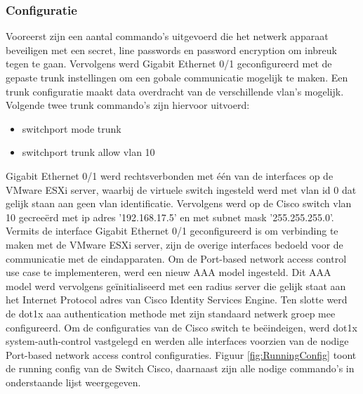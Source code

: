 \subsubsection{Configuratie}
\label{sec:config}
Vooreerst zijn een aantal commando's uitgevoerd die het netwerk apparaat beveiligen met een secret, line passwords en password encryption om inbreuk tegen te gaan. Vervolgens werd Gigabit Ethernet 0/1 geconfigureerd met de gepaste trunk instellingen om een gobale communicatie mogelijk te maken. Een trunk configuratie maakt data overdracht van de verschillende vlan's mogelijk. Volgende twee trunk commando's zijn hiervoor uitvoerd:  

\begin{itemize}
	\item switchport mode trunk
	\item switchport trunk allow vlan 10 
\end{itemize}

Gigabit Ethernet 0/1 werd rechtsverbonden met één van de interfaces op de VMware ESXi server, waarbij de virtuele switch ingesteld werd met vlan id 0 dat gelijk staan aan geen vlan identificatie. Vervolgens werd
op de Cisco switch vlan 10 gecreeërd met ip adres '192.168.17.5' en met subnet mask '255.255.255.0'. Vermits de interface Gigabit Ethernet 0/1 geconfigureerd is om verbinding te maken met de VMware ESXi server, zijn de overige interfaces bedoeld voor de communicatie met de eindapparaten. 
\newline
\newline
Om de Port-based network access control use case te implementeren, werd een nieuw AAA model ingesteld. Dit AAA model werd vervolgens geïnitialiseerd met een radius server die gelijk staat aan het Internet Protocol adres van Cisco Identity Services Engine. Ten slotte werd de dot1x aaa authentication methode met zijn standaard netwerk groep mee configureerd. 
\newline
\newline
Om de configuraties van de Cisco switch te beëindeigen, werd dot1x system-auth-control vastgelegd en werden alle interfaces voorzien van de nodige Port-based network access control configuraties. Figuur \ref{fig:RunningConfig} toont de running config van de Switch Cisco, daarnaast zijn alle nodige commando's in onderstaande lijst weergegeven.

